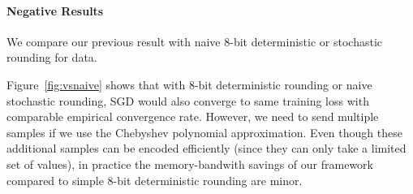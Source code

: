 \documentclass{article}
\begin{document}
\paragraph{Negative Results}
We compare our previous result with naive 8-bit deterministic or stochastic rounding for data.

Figure~\ref{fig:vsnaive} shows that with 8-bit deterministic rounding or naive
stochastic rounding, SGD would also converge to same training loss with comparable
empirical convergence rate. However, we need to send multiple samples if we use the Chebyshev polynomial approximation. 
Even though these additional samples can be encoded efficiently (since they can only take a limited set of values), 
in practice the memory-bandwith savings of our framework
compared to simple 8-bit deterministic rounding are minor. 
\end{document}
